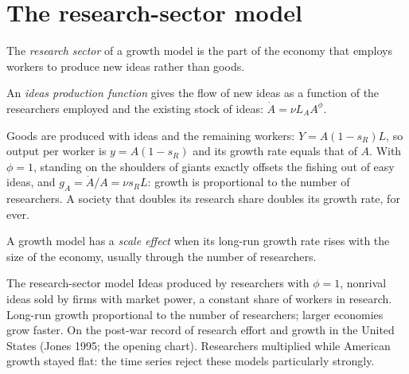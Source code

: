 \section{The research-sector model}\label{sec:b2:endogenous-growth:research}

\begin{definition}\label{def:b2:endogenous-growth:research-sector}
The \emph{research sector} of a growth model is the part of the economy that employs workers to
produce new ideas rather than goods.
\end{definition}

\begin{definition}\label{def:b2:endogenous-growth:ideas-production}
An \emph{ideas production function} gives the flow of new ideas as a function of the
researchers employed and the existing stock of ideas: $\dot A = \nu L_AA^\phi$.
\end{definition}

Goods are produced with ideas and the remaining workers: $Y = A(1 - s_R)L$, so output per worker is $y = A(1 - s_R)$ and its growth rate equals that of $A$. With $\phi = 1$,
standing on the shoulders of giants exactly offsets the fishing out of easy ideas, and $g_A = \dot A/A = \nu s_RL$: growth is proportional to the number of
researchers. A society that doubles its research share doubles its growth rate, for ever.

\begin{definition}\label{def:b2:endogenous-growth:scale-effect}
A growth model has a \emph{scale effect} when its long-run growth rate rises with the
size of the economy, usually through the number of researchers.
\end{definition}

\begin{model}{The research-sector model}
\assumes Ideas produced by researchers with $\phi = 1$, nonrival ideas sold by firms with market power, a constant share of
workers in research.
\predicts Long-run growth proportional to the number of researchers; larger economies grow faster.
\tested On the post-war record of research effort and growth in the United States (Jones 1995; the opening chart).
\breaks Researchers multiplied while American growth stayed flat: the time series reject these models particularly
strongly.
\end{model}

